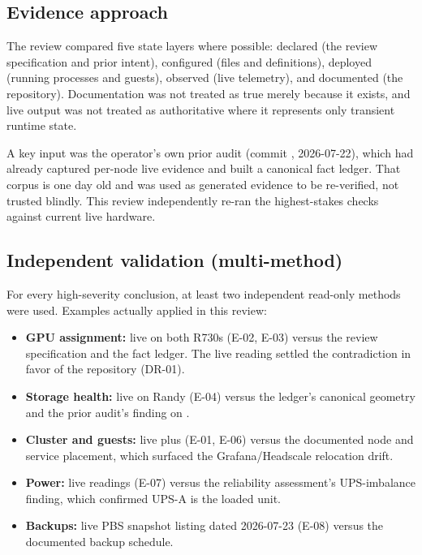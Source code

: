 \subsection{Evidence approach}

The review compared five state layers where possible: declared (the review
specification and prior intent), configured (files and definitions), deployed
(running processes and guests), observed (live telemetry), and documented (the
repository). Documentation was not treated as true merely because it exists, and
live output was not treated as authoritative where it represents only transient
runtime state.

A key input was the operator's own prior audit (commit , 2026-07-22),
which had already captured per-node live evidence and built a canonical fact ledger.
That corpus is one day old and was used as generated evidence to be re-verified, not
trusted blindly. This review independently re-ran the highest-stakes checks against
current live hardware.

\subsection{Independent validation (multi-method)}

For every high-severity conclusion, at least two independent read-only methods were
used. Examples actually applied in this review:

\begin{itemize}
  \item \textbf{GPU assignment:} live  on both R730s (E-02, E-03)
  versus the review specification and the fact ledger. The live reading settled the
  contradiction in favor of the repository (DR-01).
  \item \textbf{Storage health:} live  on Randy (E-04) versus the
  ledger's canonical geometry and the prior audit's finding on .
  \item \textbf{Cluster and guests:} live  plus
   (E-01, E-06) versus the documented node and
  service placement, which surfaced the Grafana/Headscale relocation drift.
  \item \textbf{Power:} live  readings (E-07) versus the reliability
  assessment's UPS-imbalance finding, which confirmed UPS-A is the loaded unit.
  \item \textbf{Backups:} live PBS snapshot listing dated 2026-07-23 (E-08) versus
  the documented backup schedule.
\end{itemize}

